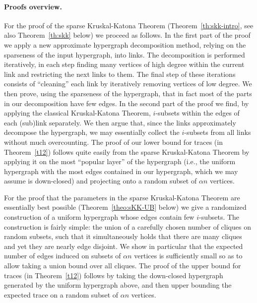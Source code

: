 \documentclass[11pt]{article}
\renewcommand{\a}{\alpha}
\begin{document}
\paragraph{Proofs overview.}
For the proof of the sparse Kruskal-Katona Theorem (Theorem~\ref{th:skk-intro}, see also Theorem~\ref{th:skk} below) we proceed as follows. In the first part of the proof we apply a new approximate hypergraph decomposition method, relying on the sparseness of the input hypergraph, into  links. The decomposition is performed iteratively, in each step finding many vertices of high degree within the current link and restricting the next links to them. The final step of these iterations consists of ``cleaning'' each link by iteratively removing vertices of low degree. We then prove, using the sparseness of the hypergraph, that in fact most of the parts in our decomposition have few edges.  
In the second part of the proof we find, by applying the classical Kruskal-Katona Theorem, $i$-subsets within the edges of each (sub)link separately. We then argue that, since the links approximately decompose the hypergraph, we may essentially collect the $i$-subsets from all links without much overcounting.
The proof of our lower bound for traces (in Theorem~\ref{t12}) follows quite easily from the sparse Kruskal-Katona Theorem by applying it on the most ``popular layer'' of the hypergraph (i.e., the uniform hypergraph with the most edges contained in our hypergraph, which we may assume is down-closed) and projecting onto a random subset of $\a n$ vertices.

For the proof that the parameters in the sparse Kruskal-Katona Theorem are essentially best possible (Theorem~\ref{theo:sKK-UB} below)
we give a randomized construction of a uniform hypergraph whose edges contain few $i$-subsets. The construction is fairly simple: the union of a carefully chosen number of cliques on random subsets, such that it simultaneously holds that there are many cliques and yet they are nearly edge disjoint. We show in particular that the expected number of edges induced on subsets of $\a n$ vertices is sufficiently small so as to allow taking a union bound over all cliques. 
The proof of the upper bound for traces (in Theorem~\ref{t12}) follows by taking the down-closed hypergraph generated by the uniform hypergraph above, and then upper bounding the expected trace on a random subset of $\a n$ vertices.
\vspace{0.2cm}
\end{document}
